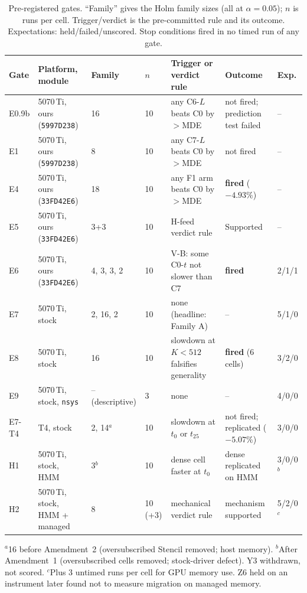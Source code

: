 \begin{table}[t]
\centering
\setlength{\tabcolsep}{3pt}
\caption{Pre-registered gates. ``Family'' gives the Holm family sizes
(all at $\alpha=0.05$); $n$ is runs per cell. Trigger/verdict is the
pre-committed rule and its outcome. Expectations: held/failed/unscored.
Stop conditions fired in no timed run of any gate.}
\label{tab:gates}
\footnotesize
\begin{tabular}{@{}lllllll@{}}
\toprule
Gate & Platform, module & Family & $n$ & Trigger or verdict rule & Outcome & Exp.\\
\midrule
E0.9b & 5070\,Ti, ours (\texttt{5997D238}) & 16 & 10 & any C6-$L$ beats C0 by $>$MDE & not fired; prediction test failed & --\\
E1    & 5070\,Ti, ours (\texttt{5997D238}) & 8  & 10 & any C7-$L$ beats C0 by $>$MDE & not fired & --\\
E4    & 5070\,Ti, ours (\texttt{33FD42E6}) & 18 & 10 & any F1 arm beats C0 by $>$MDE & \textbf{fired} ($-4.93\%$) & --\\
E5    & 5070\,Ti, ours (\texttt{33FD42E6}) & 3+3 & 10 & H-feed verdict rule & Supported & --\\
E6    & 5070\,Ti, ours (\texttt{33FD42E6}) & 4, 3, 3, 2 & 10 & V-B: some C0-$t$ not slower than C7 & \textbf{fired} & 2/1/1\\
E7    & 5070\,Ti, stock & 2, 16, 2 & 10 & none (headline: Family A) & -- & 5/1/0\\
E8    & 5070\,Ti, stock & 16 & 10 & slowdown at $K<512$ falsifies generality & \textbf{fired} (6 cells) & 3/2/0\\
E9    & 5070\,Ti, stock, \texttt{nsys} & -- (descriptive) & 3 & none & -- & 4/0/0\\
E7-T4 & T4, stock & 2, 14$^{a}$ & 10 & slowdown at $t_0$ or $t_{25}$ & not fired; replicated ($-5.07\%$) & 3/0/0\\
H1    & 5070\,Ti, stock, HMM & 3$^{b}$ & 10 & dense cell faster at $t_0$ & dense replicated on HMM & 3/0/0$^{b}$\\
H2    & 5070\,Ti, stock, HMM + managed & 8 & 10 (+3) & mechanical verdict rule & mechanism supported & 5/2/0$^{c}$\\
\bottomrule
\end{tabular}

\smallskip
\raggedright
$^{a}$16 before Amendment~2 (oversubscribed Stencil removed; host memory).
$^{b}$After Amendment~1 (oversubscribed cells removed; stock-driver
defect). Y3 withdrawn, not scored.
$^{c}$Plus 3 untimed runs per cell for GPU memory use. Z6 held on an
instrument later found not to measure migration on managed memory.
\end{table}
